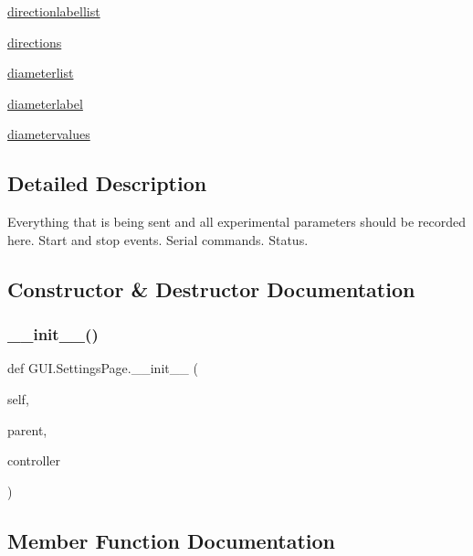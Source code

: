 \begin{DoxyCompactItemize}
\item 
\mbox{\hyperlink{class_g_u_i_1_1_settings_page_a597d9da12474943d5902570ba7704960}{directionlabellist}}
\item 
\mbox{\hyperlink{class_g_u_i_1_1_settings_page_a9e1a8320c37b53d92dc6b0c2002d691d}{directions}}
\item 
\mbox{\hyperlink{class_g_u_i_1_1_settings_page_ab5f709e6a5dd93bc4e0af4b10c1df15a}{diameterlist}}
\item 
\mbox{\hyperlink{class_g_u_i_1_1_settings_page_a9cc6fad3f9bda2f1fd9aa4f2b0746f66}{diameterlabel}}
\item 
\mbox{\hyperlink{class_g_u_i_1_1_settings_page_a933126547957dd113bbe904d22ac0039}{diametervalues}}
\end{DoxyCompactItemize}


\subsection{Detailed Description}
\begin{DoxyVerb}Everything that is being sent and all experimental parameters
should be recorded here. Start and stop events. Serial commands. Status.
\end{DoxyVerb}
 

\subsection{Constructor \& Destructor Documentation}
\mbox{\label{class_g_u_i_1_1_settings_page_ac0a857a6f98b6e7323e45ad98d33d524}} 
\subsubsection{\texorpdfstring{\_\_init\_\_()}{\_\_init\_\_()}}
{\footnotesize\ttfamily def G\+U\+I.\+Settings\+Page.\+\_\+\+\_\+init\+\_\+\+\_\+ (\begin{DoxyParamCaption}\item[{}]{self,  }\item[{}]{parent,  }\item[{}]{controller }\end{DoxyParamCaption})}



\subsection{Member Function Documentation}
\mbox{\label{class_g_u_i_1_1_settings_page_af63ab2ad5c435dd299760591bc65f642}} 
